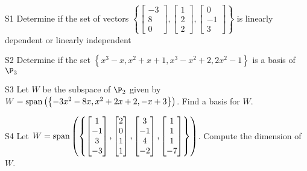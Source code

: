 \documentclass{sbgLAexam}
\begin{document}
\begin{problem}{S1}
Determine if the set of vectors $\left\{ \begin{bmatrix} -3 \\ 8 \\ 0 \end{bmatrix}, \begin{bmatrix} 1 \\ 2 \\ 2 \end{bmatrix}, \begin{bmatrix} 0 \\ -1 \\ 3 \end{bmatrix} \right\}$ is  linearly dependent or linearly independent
\end{problem}

\begin{problem}{S2}
Determine if the set $\left\{ x^3-x, x^2+x+1, x^3-x^2+2, 2x^2-1 \right\}$ is a basis of $\P_3$
\end{problem}

\begin{problem}{S3}
Let $W$ be the subspace of $\P_2$ given by $W = {\rm span} \left( \left\{  -3x^2-8x, x^2+2x+2, -x+3\right\} \right)$.   Find a basis for $W$.
\end{problem}

\begin{problem}{S4}
Let $W={\rm span}\left( \left\{ \begin{bmatrix} 1 \\ -1 \\ 3 \\ -3 \end{bmatrix},\begin{bmatrix} 2 \\ 0 \\ 1 \\ 1 \end{bmatrix}, \begin{bmatrix} 3 \\ -1 \\ 4 \\ -2 \end{bmatrix},  \begin{bmatrix} 1 \\ 1 \\ 1 \\ -7 \end{bmatrix} \right\}\right)$.  Compute the dimension of $W$.
\end{problem}
\end{document}
